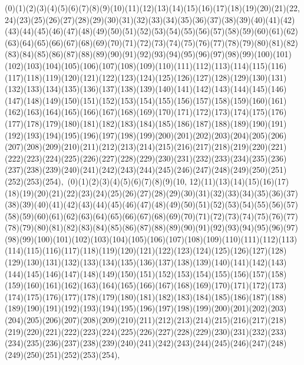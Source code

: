 \documentclass[12pt]{article}
\begin{document}
{(0)(1)(2)(3)(4)(5)(6)(7)(8)(9)(10)(11)(12)(13)(14)(15)(16)(17)(18)(19)(20)(21)(22, 24)(23)(25)(26)(27)(28)(29)(30)(31)(32)(33)(34)(35)(36)(37)(38)(39)(40)(41)(42)(43)(44)(45)(46)(47)(48)(49)(50)(51)(52)(53)(54)(55)(56)(57)(58)(59)(60)(61)(62)(63)(64)(65)(66)(67)(68)(69)(70)(71)(72)(73)(74)(75)(76)(77)(78)(79)(80)(81)(82)(83)(84)(85)(86)(87)(88)(89)(90)(91)(92)(93)(94)(95)(96)(97)(98)(99)(100)(101)(102)(103)(104)(105)(106)(107)(108)(109)(110)(111)(112)(113)(114)(115)(116)(117)(118)(119)(120)(121)(122)(123)(124)(125)(126)(127)(128)(129)(130)(131)(132)(133)(134)(135)(136)(137)(138)(139)(140)(141)(142)(143)(144)(145)(146)(147)(148)(149)(150)(151)(152)(153)(154)(155)(156)(157)(158)(159)(160)(161)(162)(163)(164)(165)(166)(167)(168)(169)(170)(171)(172)(173)(174)(175)(176)(177)(178)(179)(180)(181)(182)(183)(184)(185)(186)(187)(188)(189)(190)(191)(192)(193)(194)(195)(196)(197)(198)(199)(200)(201)(202)(203)(204)(205)(206)(207)(208)(209)(210)(211)(212)(213)(214)(215)(216)(217)(218)(219)(220)(221)(222)(223)(224)(225)(226)(227)(228)(229)(230)(231)(232)(233)(234)(235)(236)(237)(238)(239)(240)(241)(242)(243)(244)(245)(246)(247)(248)(249)(250)(251)(252)(253)(254)$
, 
$
(0)(1)(2)(3)(4)(5)(6)(7)(8)(9)(10, 12)(11)(13)(14)(15)(16)(17)(18)(19)(20)(21)(22)(23)(24)(25)(26)(27)(28)(29)(30)(31)(32)(33)(34)(35)(36)(37)(38)(39)(40)(41)(42)(43)(44)(45)(46)(47)(48)(49)(50)(51)(52)(53)(54)(55)(56)(57)(58)(59)(60)(61)(62)(63)(64)(65)(66)(67)(68)(69)(70)(71)(72)(73)(74)(75)(76)(77)(78)(79)(80)(81)(82)(83)(84)(85)(86)(87)(88)(89)(90)(91)(92)(93)(94)(95)(96)(97)(98)(99)(100)(101)(102)(103)(104)(105)(106)(107)(108)(109)(110)(111)(112)(113)(114)(115)(116)(117)(118)(119)(120)(121)(122)(123)(124)(125)(126)(127)(128)(129)(130)(131)(132)(133)(134)(135)(136)(137)(138)(139)(140)(141)(142)(143)(144)(145)(146)(147)(148)(149)(150)(151)(152)(153)(154)(155)(156)(157)(158)(159)(160)(161)(162)(163)(164)(165)(166)(167)(168)(169)(170)(171)(172)(173)(174)(175)(176)(177)(178)(179)(180)(181)(182)(183)(184)(185)(186)(187)(188)(189)(190)(191)(192)(193)(194)(195)(196)(197)(198)(199)(200)(201)(202)(203)(204)(205)(206)(207)(208)(209)(210)(211)(212)(213)(214)(215)(216)(217)(218)(219)(220)(221)(222)(223)(224)(225)(226)(227)(228)(229)(230)(231)(232)(233)(234)(235)(236)(237)(238)(239)(240)(241)(242)(243)(244)(245)(246)(247)(248)(249)(250)(251)(252)(253)(254)$
, 
$
}
\end{document}
